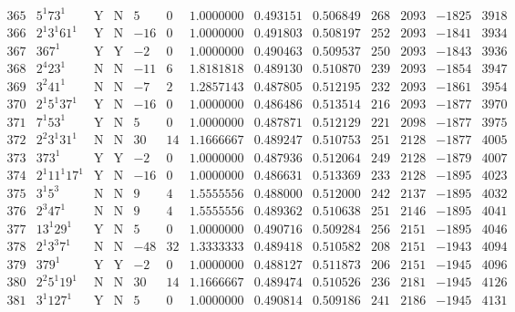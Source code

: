 \documentclass[11pt,reqno,a4letter]{article}
\numberwithin{equation}{section}
\numberwithin{figure}{section}
\numberwithin{table}{section}
\theoremstyle{plain}
\numberwithin{theorem}{section}
\theoremstyle{definition}
\begin{document}
\begin{table}[ht]
\begin{equation*}
{\begin{array}{cc|cc|ccc|cc|cccc}
 365 & 5^1 73^1 & \text{Y} & \text{N} & 5 & 0 & 1.0000000 & 0.493151 & 0.506849 & 268 & 2093 & -1825 & 3918 \\
 366 & 2^1 3^1 61^1 & \text{Y} & \text{N} & -16 & 0 & 1.0000000 & 0.491803 & 0.508197 & 252 & 2093 & -1841 & 3934 \\
 367 & 367^1 & \text{Y} & \text{Y} & -2 & 0 & 1.0000000 & 0.490463 & 0.509537 & 250 & 2093 & -1843 & 3936 \\
 368 & 2^4 23^1 & \text{N} & \text{N} & -11 & 6 & 1.8181818 & 0.489130 & 0.510870 & 239 & 2093 & -1854 & 3947 \\
 369 & 3^2 41^1 & \text{N} & \text{N} & -7 & 2 & 1.2857143 & 0.487805 & 0.512195 & 232 & 2093 & -1861 & 3954 \\
 370 & 2^1 5^1 37^1 & \text{Y} & \text{N} & -16 & 0 & 1.0000000 & 0.486486 & 0.513514 & 216 & 2093 & -1877 & 3970 \\
 371 & 7^1 53^1 & \text{Y} & \text{N} & 5 & 0 & 1.0000000 & 0.487871 & 0.512129 & 221 & 2098 & -1877 & 3975 \\
 372 & 2^2 3^1 31^1 & \text{N} & \text{N} & 30 & 14 & 1.1666667 & 0.489247 & 0.510753 & 251 & 2128 & -1877 & 4005 \\
 373 & 373^1 & \text{Y} & \text{Y} & -2 & 0 & 1.0000000 & 0.487936 & 0.512064 & 249 & 2128 & -1879 & 4007 \\
 374 & 2^1 11^1 17^1 & \text{Y} & \text{N} & -16 & 0 & 1.0000000 & 0.486631 & 0.513369 & 233 & 2128 & -1895 & 4023 \\
 375 & 3^1 5^3 & \text{N} & \text{N} & 9 & 4 & 1.5555556 & 0.488000 & 0.512000 & 242 & 2137 & -1895 & 4032 \\
 376 & 2^3 47^1 & \text{N} & \text{N} & 9 & 4 & 1.5555556 & 0.489362 & 0.510638 & 251 & 2146 & -1895 & 4041 \\
 377 & 13^1 29^1 & \text{Y} & \text{N} & 5 & 0 & 1.0000000 & 0.490716 & 0.509284 & 256 & 2151 & -1895 & 4046 \\
 378 & 2^1 3^3 7^1 & \text{N} & \text{N} & -48 & 32 & 1.3333333 & 0.489418 & 0.510582 & 208 & 2151 & -1943 & 4094 \\
 379 & 379^1 & \text{Y} & \text{Y} & -2 & 0 & 1.0000000 & 0.488127 & 0.511873 & 206 & 2151 & -1945 & 4096 \\
 380 & 2^2 5^1 19^1 & \text{N} & \text{N} & 30 & 14 & 1.1666667 & 0.489474 & 0.510526 & 236 & 2181 & -1945 & 4126 \\
 381 & 3^1 127^1 & \text{Y} & \text{N} & 5 & 0 & 1.0000000 & 0.490814 & 0.509186 & 241 & 2186 & -1945 & 4131 \\

\end{array}}
\end{equation*}
\end{table}
\end{document}
